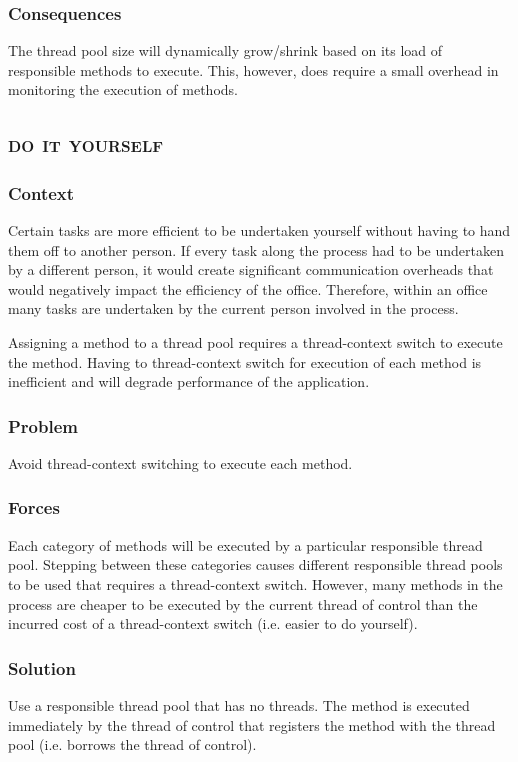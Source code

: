 \documentclass[prodmode]{style/acmlarge}
\begin{document}
\subsubsection*{Consequences} The thread pool size will dynamically grow/shrink
based on its load of responsible methods to execute.  This, however, does
require a small overhead in monitoring the execution of methods.



\subsection{\textsc{\textbf{do it yourself}}}

\subsubsection*{Context} Certain tasks are more efficient to be undertaken
yourself without having to hand them off to another person.  If every task along
the process had to be undertaken by a different person, it would create
significant communication overheads that would negatively impact the efficiency
of the office.  Therefore, within an office many tasks are undertaken by the
current person involved in the process.

Assigning a method to a thread pool requires a thread-context switch to execute
the method.  Having to thread-context switch for execution of each method is
inefficient and will degrade performance of the application.

\subsubsection*{Problem} Avoid thread-context switching to execute each method.

\subsubsection*{Forces} Each category of methods will be executed by a
particular responsible thread pool.  Stepping between these categories causes
different responsible thread pools to be used that requires a thread-context
switch.  However, many methods in the process are cheaper to be executed by the
current thread of control than the incurred cost of a thread-context switch
(i.e. easier to do yourself).

\subsubsection*{Solution} Use a responsible thread pool that has no threads.
The method is executed immediately by the thread of control that registers the
method with the thread pool (i.e. borrows the thread of control).
\end{document}
